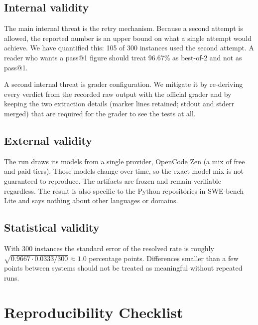 \documentclass[11pt,a4paper]{article}
\begin{document}
\subsection{Internal validity}

The main internal threat is the retry mechanism. Because a second attempt is allowed,
the reported number is an upper bound on what a single attempt would achieve. We have
quantified this: 105 of 300 instances used the second attempt. A reader who wants a
pass@1 figure should treat 96.67\% as best-of-2 and not as pass@1.

A second internal threat is grader configuration. We mitigate it by re-deriving every
verdict from the recorded raw output with the official grader and by keeping the two
extraction details (marker lines retained; stdout and stderr merged) that are required
for the grader to see the tests at all.

\subsection{External validity}

The run draws its models from a single provider, OpenCode Zen (a mix of free and paid tiers). Those models change over time, so
the exact model mix is not guaranteed to reproduce. The artifacts are frozen and remain
verifiable regardless. The result is also specific to the Python repositories in
SWE-bench Lite and says nothing about other languages or domains.

\subsection{Statistical validity}

With 300 instances the standard error of the resolved rate is roughly
$\sqrt{0.9667 \cdot 0.0333 / 300} \approx 1.0$ percentage points. Differences smaller than a
few points between systems should not be treated as meaningful without repeated runs.

\section{Reproducibility Checklist}
\label{sec:repro-checklist}
\end{document}

